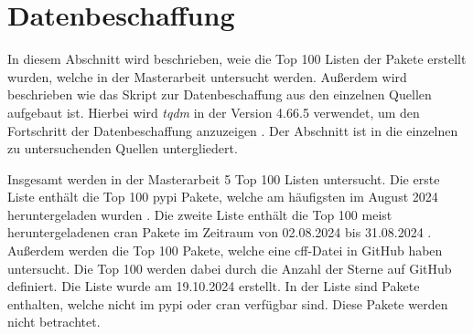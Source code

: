 \section{Datenbeschaffung}
\label{sec:datenbeschaffung}


In diesem Abschnitt wird beschrieben, weie die Top 100 Listen der Pakete erstellt wurden, welche in der Masterarbeit untersucht werden.
Außerdem wird beschrieben wie das Skript zur Datenbeschaffung aus den einzelnen Quellen aufgebaut ist.
Hierbei wird \emph{tqdm} in der Version 4.66.5 verwendet, um den Fortschritt der Datenbeschaffung anzuzeigen \autocite{costa-luis_tqdm_2024}.
Der Abschnitt ist in die einzelnen zu untersuchenden Quellen untergliedert.

Insgesamt werden in der Masterarbeit 5 Top 100 Listen untersucht.
Die erste Liste enthält die Top 100 \gls{pypi} Pakete, welche am häufigsten im August 2024 heruntergeladen wurden \autocite{kemenade_hugovktop-pypi-packages_2024}.
Die zweite Liste enthält die Top 100 meist heruntergeladenen \gls{cran} Pakete im Zeitraum von 02.08.2024 bis 31.08.2024 \autocite{csardi_r-hubcranlogsapp_2024}.
Außerdem werden die Top 100 Pakete, welche eine \gls{cff}-Datei in GitHub haben untersucht.
Die Top 100 werden dabei durch die Anzahl der Sterne auf GitHub definiert.
Die Liste wurde am 19.10.2024 erstellt.
In der Liste sind Pakete enthalten, welche nicht im \gls{pypi} oder \gls{cran} verfügbar sind.
Diese Pakete werden nicht betrachtet.

